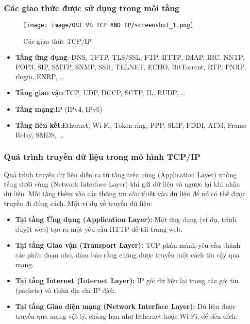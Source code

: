 \documentclass[a4paper,12pt]{article}
\begin{document}
\subsubsection{Các giao thức được sử dụng trong mỗi tầng}

\begin{figure}[htbp]
    \centering
    \texttt{[image: image/OSI VS TCP AND IP/screenshot\_1.png]}
    \caption{Các giao thức TCP/IP}
    \label{}
\end{figure}



\begin{itemize}
    \item \textbf{Tầng ứng dụng}: DNS, TFTP, TLS/SSL, FTP, HTTP, IMAP, IRC, NNTP, POP3, SIP, SMTP, SNMP, SSH, TELNET, ECHO, BitTorrent, RTP, PNRP, rlogin, ENRP, …
    \item \textbf{Tầng giao vận}:TCP, UDP, DCCP, SCTP, IL, RUDP, …
    \item \textbf{Tầng mạng}:IP (IPv4, IPv6)
    \item \textbf{Tầng liên kết}:Ethernet, Wi-Fi, Token ring, PPP, SLIP, FDDI, ATM, Frame Relay, SMDS, …
\end{itemize}







\subsubsection{Quá trình truyền dữ liệu trong mô hình TCP/IP}
Quá trình truyền dữ liệu diễn ra từ tầng trên cùng (Application Layer) xuống tầng dưới cùng (Network Interface Layer) khi gửi dữ liệu và ngược lại khi nhận dữ liệu. Mỗi tầng thêm vào các thông tin cần thiết vào dữ liệu để nó có thể được truyền đi đúng cách.
Một ví dụ về  truyền dữ liệu:
\begin{itemize}
    \item \textbf{Tại tầng Ứng dụng (Application Layer): }Một ứng dụng (ví dụ, trình duyệt web) tạo ra một yêu cầu HTTP để tải trang web.
    \item \textbf{Tại tầng Giao vận (Transport Layer):}  TCP phân mảnh yêu cầu thành các phân đoạn nhỏ, đảm bảo rằng chúng được truyền một cách tin cậy qua mạng.
    \item \textbf{Tại tầng Internet (Internet Layer): }IP gói dữ liệu lại trong các gói tin (packets) và thêm địa chỉ IP đích.
    \item \textbf{Tại tầng Giao diện mạng (Network Interface Layer):}  Dữ liệu được truyền qua mạng vật lý, chẳng hạn như Ethernet hoặc Wi-Fi, để đến đích.
\end{itemize}
\end{document}
